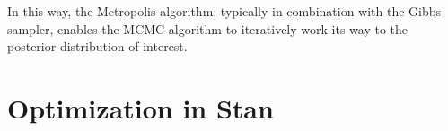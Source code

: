 In this way, the Metropolis algorithm, typically in combination with the Gibbs sampler, enables the MCMC algorithm to iteratively work its way to the posterior distribution of interest.

%  
% 
% 
        
\section{Optimization in Stan} %

